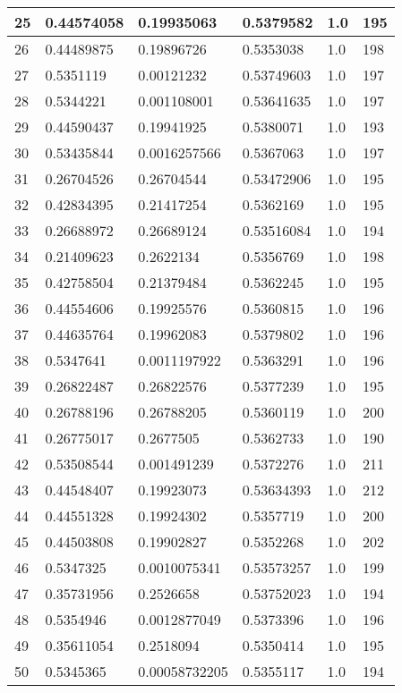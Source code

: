 \begin{longtable}{|l|l|l|l|l|l|}
25 & 0.44574058 & 0.19935063 & 0.5379582 & 1.0 & 195 \\ \hline 
26 & 0.44489875 & 0.19896726 & 0.5353038 & 1.0 & 198 \\ \hline 
27 & 0.5351119 & 0.00121232 & 0.53749603 & 1.0 & 197 \\ \hline 
28 & 0.5344221 & 0.001108001 & 0.53641635 & 1.0 & 197 \\ \hline 
29 & 0.44590437 & 0.19941925 & 0.5380071 & 1.0 & 193 \\ \hline 
30 & 0.53435844 & 0.0016257566 & 0.5367063 & 1.0 & 197 \\ \hline 
31 & 0.26704526 & 0.26704544 & 0.53472906 & 1.0 & 195 \\ \hline 
32 & 0.42834395 & 0.21417254 & 0.5362169 & 1.0 & 195 \\ \hline 
33 & 0.26688972 & 0.26689124 & 0.53516084 & 1.0 & 194 \\ \hline 
34 & 0.21409623 & 0.2622134 & 0.5356769 & 1.0 & 198 \\ \hline 
35 & 0.42758504 & 0.21379484 & 0.5362245 & 1.0 & 195 \\ \hline 
36 & 0.44554606 & 0.19925576 & 0.5360815 & 1.0 & 196 \\ \hline 
37 & 0.44635764 & 0.19962083 & 0.5379802 & 1.0 & 196 \\ \hline 
38 & 0.5347641 & 0.0011197922 & 0.5363291 & 1.0 & 196 \\ \hline 
39 & 0.26822487 & 0.26822576 & 0.5377239 & 1.0 & 195 \\ \hline 
40 & 0.26788196 & 0.26788205 & 0.5360119 & 1.0 & 200 \\ \hline 
41 & 0.26775017 & 0.2677505 & 0.5362733 & 1.0 & 190 \\ \hline 
42 & 0.53508544 & 0.001491239 & 0.5372276 & 1.0 & 211 \\ \hline 
43 & 0.44548407 & 0.19923073 & 0.53634393 & 1.0 & 212 \\ \hline 
44 & 0.44551328 & 0.19924302 & 0.5357719 & 1.0 & 200 \\ \hline 
45 & 0.44503808 & 0.19902827 & 0.5352268 & 1.0 & 202 \\ \hline 
46 & 0.5347325 & 0.0010075341 & 0.53573257 & 1.0 & 199 \\ \hline 
47 & 0.35731956 & 0.2526658 & 0.53752023 & 1.0 & 194 \\ \hline 
48 & 0.5354946 & 0.0012877049 & 0.5373396 & 1.0 & 196 \\ \hline 
49 & 0.35611054 & 0.2518094 & 0.5350414 & 1.0 & 195 \\ \hline 
50 & 0.5345365 & 0.00058732205 & 0.5355117 & 1.0 & 194 \\ \hline 
\end{longtable}
